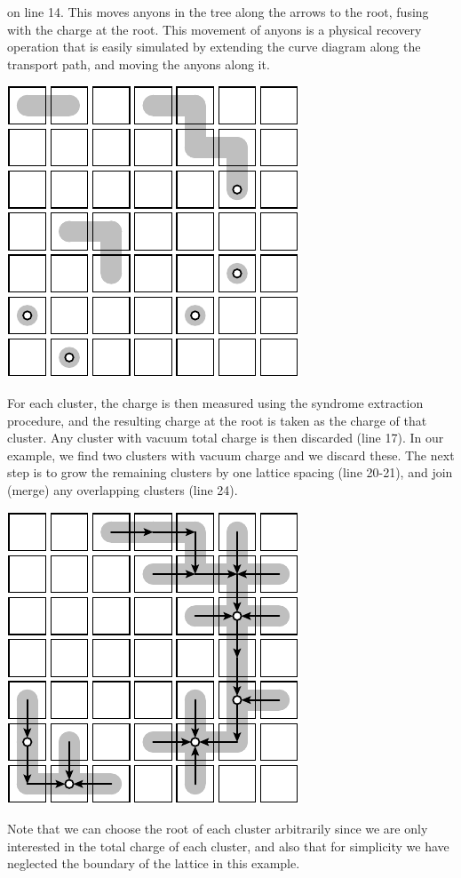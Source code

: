 \documentclass[aps, letterpaper, onecolumn, superscriptaddress, notitlepage, 10pt]{revtex4-1}
\begin{document}
on line 14.
This moves anyons in the tree along the arrows to the root, 
fusing with the charge at the root. This movement of anyons is a physical recovery operation that is easily simulated by extending the curve diagram along the transport path, and moving the anyons along it.
\begin{center}
\includegraphics[]{pic-decode-2.pdf}
\end{center}
For each cluster, the charge is then measured using the syndrome extraction procedure, and the resulting charge at the root is taken as the charge of
that cluster. Any cluster with vacuum total charge is then discarded (line 17).
In our example, we find two clusters with vacuum charge and we discard these.
The next step is to grow the remaining clusters by one lattice spacing (line 20-21),
and join (merge) any overlapping clusters (line 24).
\begin{center}
\includegraphics[]{pic-decode-3.pdf}
\end{center}
Note that we can choose the root of each cluster arbitrarily
since we are only interested in the total charge of each cluster, and also that for simplicity we have neglected the boundary of the lattice in
this example.
\end{document}
